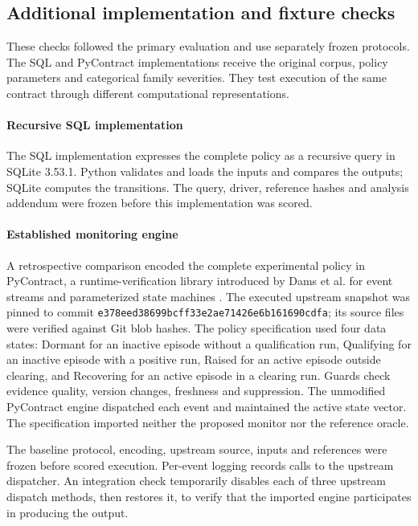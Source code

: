 \documentclass[preprint,11pt]{elsarticle}
\begin{document}
\subsection{Additional implementation and fixture checks}
These checks followed the primary evaluation and use separately frozen protocols. The SQL and PyContract implementations receive the original corpus, policy parameters and categorical family severities. They test execution of the same contract through different computational representations.

\paragraph{Recursive SQL implementation}
The SQL implementation expresses the complete policy as a recursive query in SQLite 3.53.1. Python validates and loads the inputs and compares the outputs; SQLite computes the transitions. The query, driver, reference hashes and analysis addendum were frozen before this implementation was scored.

\paragraph{Established monitoring engine}
A retrospective comparison encoded the complete experimental policy in PyContract, a runtime-verification library introduced by Dams et al. for event streams and parameterized state machines \cite{dams2022pycontract,pyrv2025pycontract}. The executed upstream snapshot was pinned to commit \texttt{e378eed38699bcff33e2ae71426e6b161690cdfa}; its source files were verified against Git blob hashes. The policy specification used four data states: Dormant for an inactive episode without a qualification run, Qualifying for an inactive episode with a positive run, Raised for an active episode outside clearing, and Recovering for an active episode in a clearing run. Guards check evidence quality, version changes, freshness and suppression. The unmodified PyContract engine dispatched each event and maintained the active state vector. The specification imported neither the proposed monitor nor the reference oracle.

The baseline protocol, encoding, upstream source, inputs and references were frozen before scored execution. Per-event logging records calls to the upstream dispatcher. An integration check temporarily disables each of three upstream dispatch methods, then restores it, to verify that the imported engine participates in producing the output.
\end{document}
